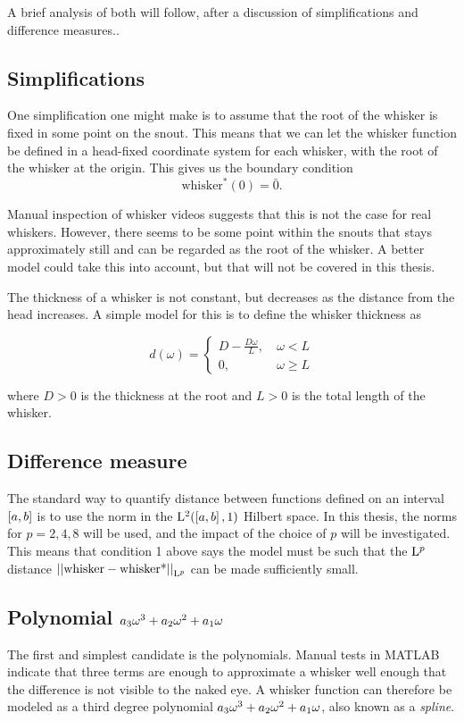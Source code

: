 A brief analysis of both will follow, after a discussion of
simplifications and difference measures..

\subsection{Simplifications}
One simplification one might make is to assume that the root of the
whisker is fixed in some point on the snout. This means that we can
let the whisker function be defined in a head-fixed coordinate system
for each whisker, with the root of the whisker at the origin. This
gives us the boundary condition
\begin{equation}
    \label{eq:bv_root}
    \text{whisker}^*(0)=\bar{0}.
\end{equation}

Manual inspection of whisker videos suggests that this is not the case
for real whiskers. However, there seems to be some point within the
snouts that stays approximately still and can be regarded as the root
of the whisker. A better model could take this into account, but that
will not be covered in this thesis.

The thickness of a whisker is not constant, but decreases as the
distance from the head increases. A simple model for this is to define
the whisker thickness as

\begin{equation}
    d(\omega) = \begin{cases}
        D-\frac{D\omega}{L},~& \omega<L\\
        0,~& \omega\ge L
    \end{cases}
\end{equation}

where $D>0$ is the thickness at the root and $L>0$ is the total length of the
whisker.

\subsection{Difference measure}
The standard way to quantify distance between functions defined on an
interval $\interval{a}{b}$ is to use the norm in the
$\Lp[2](\interval{a}{b}, 1)$ Hilbert space. In this thesis, the norms
for $p = 2, 4, 8$ will be used, and the impact of the choice of $p$
will be investigated. This means that condition 1 above says the model
must be such that the $\Lp$ distance $\Lpnorm{\text{whisker} -
  \text{whisker*}}$ can be made sufficiently small.

\subsection{Polynomial $\Spline{\omega}$}
The first and simplest candidate is the polynomials. Manual tests in
MATLAB indicate that three terms are enough to approximate a whisker
well enough that the difference is not visible to the naked eye. A
whisker function can therefore be modeled as a third degree polynomial
$\Spline{\omega}$, also known as a \emph{spline}.

